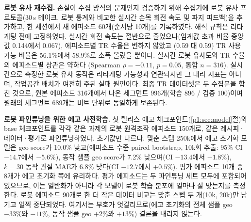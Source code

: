 \documentclass[conference,10pt]{IEEEtran}
\begin{document}
\begin{table}[t]
\centering\footnotesize\setlength{\tabcolsep}{3.5pt}
\caption{259개 에피소드의 후보 세그먼트 1{,}229개에 대한 리타게팅 변형 비교, held-out 로봇 에피소드 120개 기준.
NN: 로봇 자세까지의 최근접 이웃 관절 공간 거리(rad, p50/p90). W1: 스텝당 $|\Delta q|$의 Wasserstein 거리.}
\label{p1:tab:retarget}
\end{table}

\textbf{로봇 유사 재수집.} 손실이 수집 방식의 문제인지 검증하기 위해 수집기에 로봇 유사 프로토콜(30\,s 테이크, 로봇 통계와 비교한
실시간 손목 회전 속도 및 파지 피드백)을 추가하고, 한 세션에서 새 에피소드 60개(순서당 10개)를 기록하였다. 해석 규칙은 리타게팅 전에
고정하였다. 실시간 회전 속도는 절반으로 줄었으나(임계값 초과 비율 중앙값 0.144에서 0.067), 에피소드별 TR 수율은 변하지 않았고
(0.59 대 0.59) TR 사용 가능 비율은 56.1\%에서 58.9\%로 소폭 올랐을 뿐이다. 실시간 로봇 유사도와 TR 수율의 에피소드별 상관은 약하다
(Spearman $\rho=-0.11$, $p=0.05$, 통합 $n=316$). 실시간으로 측정한 로봇 유사 동작은 리타게팅 가능성과 연관되지만 그 대리 지표는
아니며, 작업공간 배치가 여전히 주된 실패 원인이다. 최종 TR 데이터셋은 두 수집분을 합친 것으로, 원본 에피소드 316개에서 나온 세그먼트
996개(학습 896 / 검증 100)이며 원래의 세그먼트 689개는 비트 단위로 동일하게 보존된다.

\textbf{로봇 파인튜닝을 위한 에고 사전학습.} 첫 릴리스 에고 체크포인트(\ref{p1:sec:model}절)와 base 체크포인트를 각각 같은 과제의 로봇
원격조작 에피소드 150개로, 같은 레시피·데이터·평가로 파인튜닝하였다. 초기값만 다르다. 맞춘 스텝 250k에서 에고 초기화 모델은 geo score가
10.0\% 낮고(에피소드 수준 paired bootstrap, 10k회 추출: 95\% CI $-14.7$에서 $-5.6\%$), 동작 샘플 geo score가 7.2\% 낮으며(CI $-13.4$에서
$-1.8\%$), $k{=}30$ 동작 관절 MAE가 6.8\% 낮다(CI $-12.7$에서 $+0.5\%$). 평가 에피소드 10개 중 8개가 에고 초기화 쪽에 유리하다. 평가
에피소드는 두 파인튜닝 세트 모두에 포함되어 있으므로, 이는 일반화가 아니라 각 모델이 로봇 학습 분포에 얼마나 잘 맞는지를 측정한다.
로봇 에피소드 90개로 한 더 작은 데이터 비교는 맞춘 스텝 두 개(10k, 20k)만 남기고 일찍 중단되었다. 여기서는 부호가 엇갈리므로(에고
초기화의 전체 샘플 geo $-33\%$와 $-11\%$, 동작 샘플 geo $+2\%$와 $+13\%$) 결론을 내리지 않는다.
\end{document}
